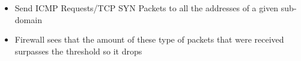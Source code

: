 \documentclass{beamer}
\begin{document}
\begin{frame}
\begin{columns}
\begin{column}{0.5\textwidth}
\begin{figure}
        \end{figure}
            \begin{itemize}[label={}]
                \item \footnotesize Send ICMP Requests/TCP SYN Packets to all the addresses of a given sub-domain
                \item \footnotesize Firewall sees that the amount of these type of packets that were received surpasses the threshold so it drops
            \end{itemize}
    \end{column}
\end{columns}
\end{frame}
\end{document}
